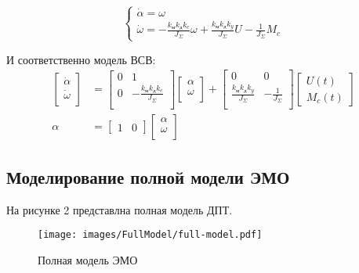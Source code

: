 \documentclass[a4paper, 12pt]{article}
\begin{document}
\begin{equation}
    \begin{cases}
    \dot{\alpha} = \omega \\
    \dot{\omega} = -\frac{k_\text{м}k_\text{д}k_e}{J_\Sigma}\omega + \frac{k_\text{м}k_\text{д}k_y}{J_\Sigma}U - \frac{1}{J_\Sigma}M_c
    \end{cases}
\end{equation}

И соответственно модель ВСВ: 
\begin{align}
    \begin{bmatrix}
        \dot{\alpha} \\
        \dot{\omega} \\
    \end{bmatrix} & = 
    \begin{bmatrix}
        0 & 1 \\
        0 & -\frac{k_\text{м}k_\text{д}k_e}{J_\Sigma} \\
    \end{bmatrix}
    \begin{bmatrix}
        \alpha \\
        \omega \\
    \end{bmatrix} + 
    \begin{bmatrix}
        0 & 0 \\
        \frac{k_\text{м}k_\text{д}k_y}{J_\Sigma} & -\frac{1}{J_\Sigma} \\
    \end{bmatrix}
    \begin{bmatrix}
        U(t) \\
        M_c(t)
    \end{bmatrix} \\
    \alpha & = 
    \begin{bmatrix}
        1 & 0 
    \end{bmatrix}
    \begin{bmatrix}
        \alpha \\
        \omega \\
    \end{bmatrix}
\end{align}

\newpage
\begin{center}
\section{Моделирование полной модели ЭМО}
\end{center}
\par На рисунке 2 представлна полная модель ДПТ.
\begin{figure}[h!]
    \centering
    \texttt{[image: images/FullModel/full-model.pdf]}
    \caption{Полная модель ЭМО}
\end{figure}
\end{document}
